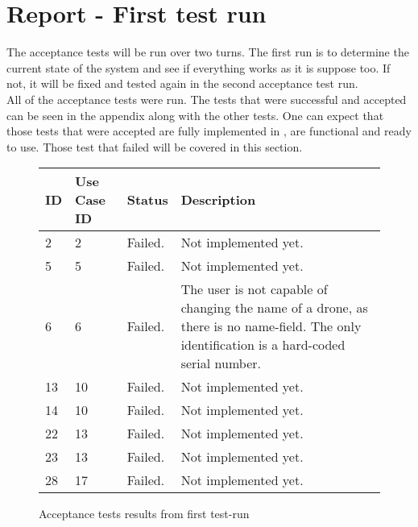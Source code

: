 \section{Report - First test run}
\label{sec:testing_report}

The acceptance tests will be run over two turns. 
The first run is to determine the current state of the system and see if everything works as it is suppose too.
If not, it will be fixed and tested again in the second acceptance test run. \\

All of the acceptance tests were run.
The tests that were successful and accepted can be seen in the appendix along with the other tests.
One can expect that those tests that were accepted are fully implemented in \projectname{}, are functional and ready to use. 
Those test that failed will be covered in this section. \\


\begin{figure}[htb]
\begin{center}
\begin{tabular}{ | l | l | l | p{8cm} | }
  \hline
	\textbf{ID} & \textbf{Use Case ID} & \textbf{Status} & \textbf{Description} \\ \hline
	2 & 2 & Failed. & Not implemented yet. \\ \hline
	5 & 5 & Failed. & Not implemented yet. \\ \hline
	6 & 6 & Failed. & The user is not capable of changing the name of a drone, as there is no name-field. The only identification is a hard-coded serial number. \\ \hline
	13 & 10 & Failed. & Not implemented yet. \\ \hline
	14 & 10 & Failed. & Not implemented yet. \\ \hline
	22 & 13 & Failed. & Not implemented yet. \\ \hline
	23 & 13 & Failed. & Not implemented yet. \\ \hline
	28 & 17 & Failed. & Not implemented yet. \\ \hline
  \hline
\end{tabular}
\caption{Acceptance tests results from first test-run}
\label{tab:acceptance_tests_results_first_run}
\end{center}
\end{figure}

